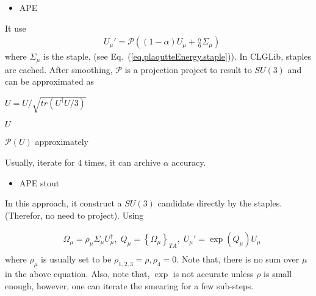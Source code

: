 \begin{itemize}
  \item {}APE
\end{itemize}

It use
\begin{equation}
\begin{split}
&U_{\mu}'=\mathcal{P}\left((1-\alpha)U_{\mu} + \frac{\alpha}{6}\Sigma _{\mu}\right)
\end{split}
\end{equation}
where $\Sigma _{\mu}$ is the staple, (see Eq.~(\ref{eq.plaqutteEnergy.staple})). In CLGLib, staples are cached. After smoothing, $\mathcal{P}$ is a projection project to result to $SU(3)$ and can be approximated as
\begin{algorithm}[H]
\begin{algorithmic}
\State $U =U / \sqrt{tr(U^{\dagger}U / 3)}$
\EndFor

\Return $U$
\end{algorithmic}
\caption{$\mathcal{P}(U)$ approximately}
\end{algorithm}

Usually, iterate for $4$ times, it can archive $\mathcal{\alpha}$ accuracy.

\begin{itemize}
  \item {}APE stout
\end{itemize}

In this approach, it construct a $SU(3)$ candidate directly by the staples. (Therefor, no need to project). Using

\begin{equation}
\begin{split}
&\Omega _{\mu}=\rho _{\mu} \Sigma _{\mu} U_{\mu}^{\dagger},\;Q_{\mu}=\left\{\Omega_{\mu}\right\}_{TA},\;U_{\mu}'=\exp (Q_{\mu}) U_{\mu}\\
\end{split}
\end{equation}
where $\rho_{\mu}$ is usually set to be $\rho_{1,2,3}=\rho,\rho_{4}=0$. Note that, there is no sum over $\mu$ in the above equation. Also, note that, $\exp$ is not accurate unless $\rho$ is small enough, however, one can iterate the smearing for a few sub-steps.

